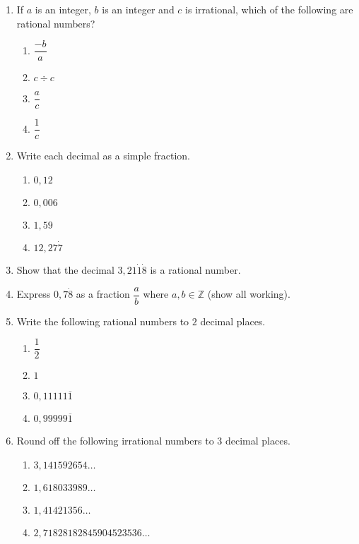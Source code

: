 \begin{eocexercises}{}
\begin{enumerate}[itemsep=5pt, label=\textbf{\arabic*}. ] 
\item If $a$ is an integer, $b$ is an integer and $c$ is irrational, which of the following are rational numbers?
\begin{multicols}{2}
    \begin{enumerate}[itemsep=4pt, label=\textbf{(\alph*)} ] 
    \item $\dfrac{-b}{a}$
    \item $c \div c$
    \item $\dfrac{a}{c}$
    \item $\dfrac{1}{c}$
    \end{enumerate}
\end{multicols}
\item Write each decimal as a simple fraction.
\begin{multicols}{2}
    \begin{enumerate}[itemsep=0pt, label=\textbf{(\alph*)} ] 
    \item $0,12$
    \item $0,006$
    \item $1,59$
    \item $12,27\dot{7}$
    \end{enumerate}
\end{multicols}
\item Show that the decimal $3,21\dot{1}\dot{8}$ is a rational number.
\item Express $0,7\dot{8}$ as a fraction $\dfrac{a}{b}$ where $a,b\in \mathbb{Z}$ (show all working).
\item Write the following rational numbers to $2$ decimal places.
\begin{multicols}{2}
    \begin{enumerate}[itemsep=5pt, label=\textbf{(\alph*)} ]  
    \item $\dfrac{1}{2}$
    \item $1$
    \item $0,11111\overline{1}$
    \item $0,99999\overline{1}$
    \end{enumerate}
\end{multicols}
\item Round off the following irrational numbers to $3$ decimal places.
\begin{multicols}{2}
    \begin{enumerate}[itemsep=2pt, label=\textbf{(\alph*)} ] 
    \item $3,141592654\ldots$
    \item $1,618033989\ldots$
    \item $1,41421356\ldots$
    \item $2,71828182845904523536\ldots$
    \end{enumerate}
\end{multicols}


\end{enumerate}
\end{eocexercises}
